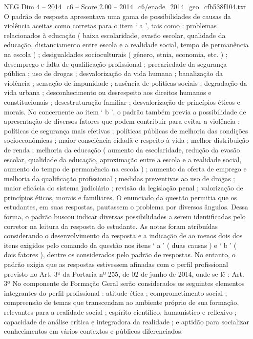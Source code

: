 \begin{textsample}{NEG Dim 4 – 2014\_c6 – Score 2.00 – 2014\_c6/enade\_2014\_geo\_cfb538f104.txt}
O padrão de resposta apresentava uma gama de possibilidades de causas da violência aceitas como corretas para o item ‘ a ’, tais como : problemas relacionados à educação ( baixa escolaridade, evasão escolar, qualidade da educação, distanciamento entre escola e a realidade social, tempo de permanência na escola ) ; desigualdades socioculturais ( gênero, etnia, economia, etc. ) ; desemprego e falta de qualificação profissional ; precariedade da segurança pública ; uso de drogas ; desvalorização da vida humana ; banalização da violência ; sensação de impunidade ; ausência de políticas sociais ; degradação da vida urbana ; desconhecimento ou desrespeito aos direitos humanos e constitucionais ; desestruturação familiar ; desvalorização de princípios éticos e morais.
No concernente ao item ‘ b ’, o padrão também previa a possibilidade de apresentação de diversos fatores que podem contribuir para evitar a violência : políticas de segurança mais efetivas ; políticas públicas de melhoria das condições socioeconômicas ; maior consciência cidadã e respeito à vida ; melhor distribuição de renda ; melhoria da educação ( aumento da escolaridade, redução da evasão escolar, qualidade da educação, aproximação entre a escola e a realidade social, aumento do tempo de permanência na escola ) ; aumento da oferta de emprego e melhoria da qualificação profissional ; medidas preventivas ao uso de drogas ; maior eficácia do sistema judiciário ; revisão da legislação penal ; valorização de princípios éticos, morais e familiares.
O enunciado da questão permitia que os estudantes, em suas respostas, pautassem o problema por diversos ângulos.
Dessa forma, o padrão buscou indicar diversas possibilidades a serem identificadas pelo corretor na leitura da resposta do estudante.
As notas foram atribuídas considerando o desenvolvimento da resposta e a indicação de ao menos dois dos itens exigidos pelo comando da questão nos itens ‘ a ’ ( duas causas ) e ‘ b ’ ( dois fatores ), dentre os considerados pelo padrão de respostas.
No entanto, o padrão exigia que as respostas estivessem afinadas com o perfil profissional previsto no Art. 3º da Portaria nº 255, de 02 de junho de 2014, onde se lê : Art. 3º No componente de Formação Geral serão considerados os seguintes elementos integrantes do perfil profissional : atitude ética ; comprometimento social ; compreensão de temas que transcendam ao ambiente próprio de sua formação, relevantes para a realidade social ; espírito científico, humanístico e reflexivo ; capacidade de análise crítica e integradora da realidade ; e aptidão para socializar conhecimentos em vários contextos e públicos diferenciados.

\end{textsample}
